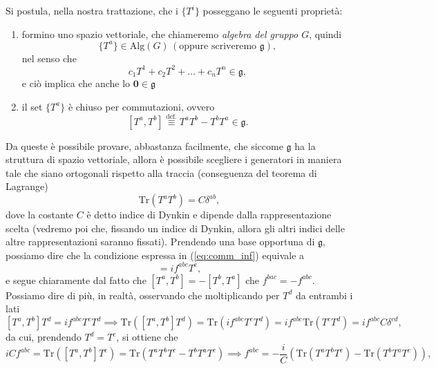 Si postula, nella nostra trattazione, che i $\{ T^i \}$ posseggano le seguenti proprietà:
\begin{enumerate}[label=\protect\circled{\arabic*}]
    \item formino uno spazio vettoriale, che chiameremo \emph{algebra del gruppo $G$}, quindi
    \begin{equation}
        \{ T^a \} \in \text{Alg}(G) \, (\text{oppure scriveremo } \mathfrak{g}),
    \end{equation}
    nel senso che
    \begin{equation}
        c_1 T^1 + c_2 T^2 + \ldots + c_n T^n \in \mathfrak{g},
    \end{equation}
    e ciò implica che anche lo $\mathbf{0} \in \mathfrak{g}$
    \item il set $\{ T^a \}$ è chiuso per commutazioni, ovvero
    \begin{equation} \label{eq:comm_inf}
        [T^a, T^b] \stackrel{\text{def.}}{\equiv} T^a T^b - T^b T^a \in \mathfrak{g}.
    \end{equation}
\end{enumerate}
Da queste è possibile provare, abbastanza facilmente, che siccome $\mathfrak{g}$ ha la struttura di spazio vettoriale, allora è possibile scegliere i generatori
in maniera tale che siano ortogonali rispetto alla traccia (conseguenza del teorema di Lagrange)
$$
    \text{Tr}(T^a T^b) = C \delta^{ab},
$$
dove la costante $C$ è detto indice di Dynkin e dipende dalla rappresentazione scelta (vedremo poi che, fissando un indice di Dynkin, allora gli altri indici delle altre rappresentazioni saranno fissati).
Prendendo una base opportuna di $\mathfrak{g}$, possiamo dire che la condizione espressa in (\ref{eq:comm_inf}) equivale a
\begin{equation}
    [T^a, T^b] = i f^{abc} T^c,
\end{equation}  
e segue chiaramente dal fatto che $[T^a, T^b] = -[T^b, T^a]$ che $f^{bac} = - f^{abc}$. Possiamo dire di più, in realtà, osservando che moltiplicando per $T^d$ da entrambi i lati
\begin{equation} \label{eq:ant_comm}
    [T^a, T^b] T^d = i f^{abc} T^c T^d \implies \text{Tr}([T^a, T^b] T^d)=\text{Tr}(i f^{abc} T^c T^d) = i f^{abc} \text{Tr}(T^c T^d) = i f^{abc} C \delta^{cd},
\end{equation}
da cui, prendendo $T^d = T^c$, si ottiene che
\begin{equation}
    iCf^{abc} = \text{Tr}([T^a, T^b] T^c) = \text{Tr}(T^a T^b T^c - T^b T^a T^c) \implies f^{abc} = - \frac{i}{C} (\text{Tr}(T^a T^b T^c) - \text{Tr}(T^b T^a T^c)), 
\end{equation}
